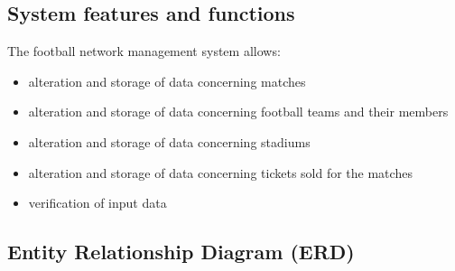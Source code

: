 \documentclass[11pt]{article}
\begin{document}
\subsection{System features and functions}
The football network management system allows:
\begin{itemize}
    \item alteration and storage of data concerning matches
    \item alteration and storage of data concerning football teams and their members
    \item alteration and storage of data concerning stadiums
    \item alteration and storage of data concerning tickets sold for the matches
    \item verification of input data
\end{itemize}

\subsection{Entity Relationship Diagram (ERD)}
\vspace{2em}
\begin{figure}[htp]
    \centering
    \label{fig:ERD}
\end{figure}
\end{document}
